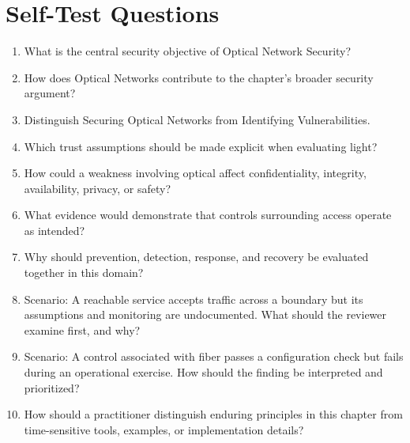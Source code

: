 \documentclass[11pt]{article}
\begin{document}
\section*{Self-Test Questions}
\begin{enumerate}
\item What is the central security objective of Optical Network Security?
\item How does Optical Networks contribute to the chapter's broader security argument?
\item Distinguish Securing Optical Networks from Identifying Vulnerabilities.
\item Which trust assumptions should be made explicit when evaluating light?
\item How could a weakness involving optical affect confidentiality, integrity, availability, privacy, or safety?
\item What evidence would demonstrate that controls surrounding access operate as intended?
\item Why should prevention, detection, response, and recovery be evaluated together in this domain?
\item Scenario: A reachable service accepts traffic across a boundary but its assumptions and monitoring are undocumented. What should the reviewer examine first, and why?
\item Scenario: A control associated with fiber passes a configuration check but fails during an operational exercise. How should the finding be interpreted and prioritized?
\item How should a practitioner distinguish enduring principles in this chapter from time-sensitive tools, examples, or implementation details?
\end{enumerate}
\end{document}
